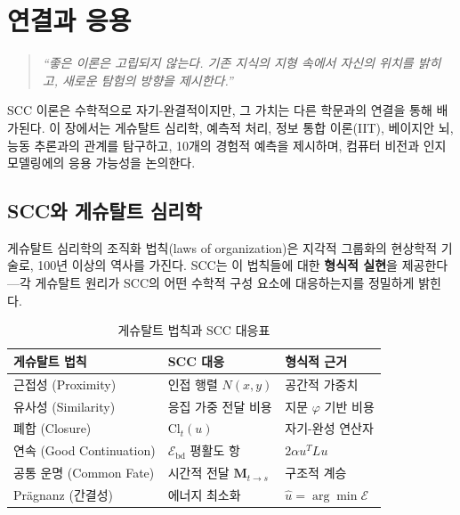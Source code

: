 
\chapter{연결과 응용}
\label{ch:connections}

\begin{quote}
\textit{``좋은 이론은 고립되지 않는다. 기존 지식의 지형 속에서 자신의 위치를 밝히고, 새로운 탐험의 방향을 제시한다.''}
\end{quote}

\noindent
SCC 이론은 수학적으로 자기-완결적이지만, 그 가치는 다른 학문과의 연결을 통해 배가된다. 이 장에서는 게슈탈트 심리학, 예측적 처리, 정보 통합 이론(IIT), 베이지안 뇌, 능동 추론과의 관계를 탐구하고, 10개의 경험적 예측을 제시하며, 컴퓨터 비전과 인지 모델링에의 응용 가능성을 논의한다.


\section{SCC와 게슈탈트 심리학}
\label{sec:gestalt}

게슈탈트 심리학의 조직화 법칙(laws of organization)은 지각적 그룹화의 현상학적 기술로, 100년 이상의 역사를 가진다. SCC는 이 법칙들에 대한 \textbf{형식적 실현}을 제공한다---각 게슈탈트 원리가 SCC의 어떤 수학적 구성 요소에 대응하는지를 정밀하게 밝힌다.

\begin{table}[h]
\centering
\caption{게슈탈트 법칙과 SCC 대응표}
\label{tab:gestalt-mapping}
\begin{tabular}{lll}
\toprule
\textbf{게슈탈트 법칙} & \textbf{SCC 대응} & \textbf{형식적 근거} \\
\midrule
근접성 (Proximity) & 인접 행렬 $N(x,y)$ & 공간적 가중치 \\
유사성 (Similarity) & 응집 가중 전달 비용 & 지문 $\varphi$ 기반 비용 \\
폐합 (Closure) & $\mathrm{Cl}_t(u)$ & 자기-완성 연산자 \\
연속 (Good Continuation) & $\mathcal{E}_{\mathrm{bd}}$ 평활도 항 & $2\alpha u^T L u$ \\
공통 운명 (Common Fate) & 시간적 전달 $\mathbf{M}_{t \to s}$ & 구조적 계승 \\
Pr\"agnanz (간결성) & 에너지 최소화 & $\hat{u} = \arg\min \mathcal{E}$ \\
\bottomrule
\end{tabular}
\end{table}

